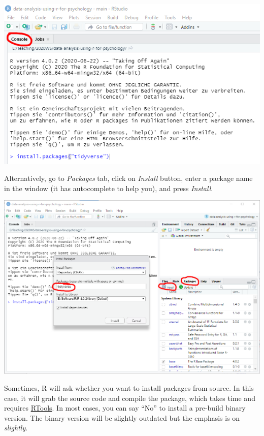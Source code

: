 \documentclass[
]{book}
\begin{document}
\begin{center}\includegraphics[width=1\linewidth]{images/install-packages-cmd} \end{center}

Alternatively, go to \emph{Packages} tab, click on \emph{Install} button, enter a package name in the window (it has autocomplete to help you), and press \emph{Install}.

\begin{center}\includegraphics[width=1\linewidth]{images/install-packages-gui} \end{center}

Sometimes, R will ask whether you want to install packages from source. In this case, it will grab the source code and compile the package, which takes time and requires \protect\hyperlink{install-rtools}{RTools}. In most cases, you can say ``No'' to install a pre-build binary version. The binary version will be slightly outdated but the emphasis is on \emph{slightly}.
\end{document}
